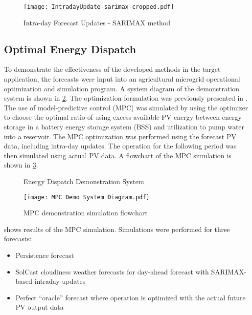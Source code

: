 \begin{figure}[tbh]
	\centering
	\texttt{[image: IntradayUpdate-sarimax-cropped.pdf]}
	\caption{Intra-day Forecast Updates - SARIMAX method}
	\label{fig:intraday-forecast}
\end{figure}


\subsection{Optimal Energy Dispatch}

To demonstrate the effectiveness of the developed methods in the target application,
the forecasts were input into an agricultural microgrid operational optimization and simulation program.
A system diagram of the demonstration system is shown in \cref{fig:demo-system}.
The optimization formulation was previously presented in \cite{Brown2022}.
The use of model-predictive control (MPC) was simulated by using the optimizer to choose the optimal ratio of using excess available PV energy between energy storage in a battery energy storage system (BSS) and utilization to pump water into a reservoir.
The MPC optimization was performed using the forecast PV data, including intra-day updates.
The operation for the following period was then simulated using actual PV data.
A flowchart of the MPC simulation is shown in \cref{fig:mpc-simulation-flowchart}.

\begin{figure}[thb]
	\centering
	\fontsize{6pt}{7pt}\selectfont
	\def\svgwidth{0.8\columnwidth}
	
	\caption{Energy Dispatch Demonstration System}
	\label{fig:demo-system}
\end{figure}

\begin{figure}[thb]
	\centering
	\texttt{[image: MPC Demo System Diagram.pdf]}
	\caption{MPC demonstration simulation flowchart}
	\label{fig:mpc-simulation-flowchart}
\end{figure}

 shows results of the MPC simulation. Simulations were performed for three forecasts:

\begin{itemize}
\item Persistence forecast
\item SolCast cloudiness weather forecasts for day-ahead forecast with SARIMAX-based intraday updates
\item Perfect ``oracle'' forecast where operation is optimized with the actual future PV output data
\end{itemize}

